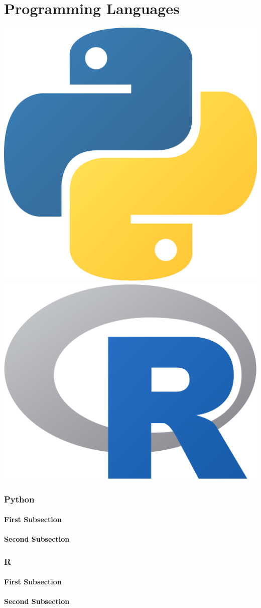 \documentclass[./FDA_document_template.tex]{subfiles}
\begin{document}
\renewcommand{\onlyinsubfile}[1]{#1}
\renewcommand{\notinsubfile}[1]{}
 
\setcounter{part}{2}
\pagestyle{Standard}

\part{Programming Languages}
 
 


\begin{center}
 \includegraphics[width=.10\textwidth]{./logos/2000px-Python-logo-notext.png}
 \includegraphics[width=.10\textwidth]{./logos/R_logo.png}
\end{center}

 \section{Python}

\lipsum[1]

\subsection{First Subsection}

\lipsum[2]

\subsection{Second Subsection}

\lipsum[3]
 
 

 \section{R}

\lipsum[1]

\subsection{First Subsection}

\lipsum[2]

\subsection{Second Subsection}

\lipsum[3]

\bigskip
 
\end{document}
